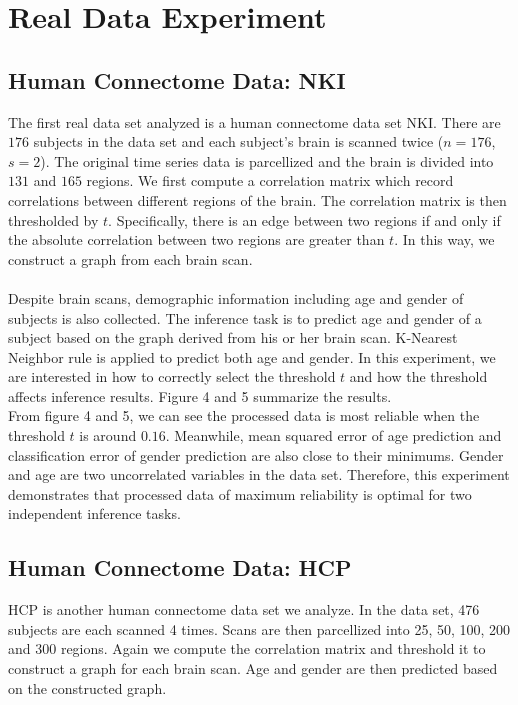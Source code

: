 \documentclass[11pt,journal,compsoc]{IEEEtran}
\begin{document}
\section{Real Data Experiment}
\subsection{Human Connectome Data: NKI}
The first real data set analyzed is a human connectome data set NKI. There are $176$ subjects in the data set and each subject's brain is scanned twice ($n=176$, $s=2$). The original time series data is parcellized and the brain is divided into $131$ and $165$ regions. We first compute a correlation matrix which record correlations between different regions of the brain. The correlation matrix is then thresholded by $t$. Specifically, there is an edge between two regions if and only if the absolute correlation between two regions are greater than $t$. In this way, we construct a graph from each brain scan.\\ 
\\
Despite brain scans, demographic information including age and gender of subjects is also collected. The inference task is to predict age and gender of a subject based on the graph derived from his or her brain scan. K-Nearest Neighbor rule is applied to predict both age and gender. In this experiment, we are interested in how to correctly select the threshold $t$ and how the threshold affects inference results. Figure 4 and 5 summarize the results.\\



\noindent From figure 4 and 5, we can see the processed data is most reliable when the threshold $t$ is around $0.16$. Meanwhile, mean squared error of age prediction and classification error of gender prediction are also close to their minimums. Gender and age are two uncorrelated variables in the data set. Therefore, this experiment demonstrates that processed data of maximum reliability is optimal for two independent inference tasks. 

\subsection{Human Connectome Data: HCP}
HCP is another human connectome data set we analyze. In the data set, 476 subjects are each scanned 4 times. Scans are then parcellized into 25, 50, 100, 200 and 300 regions. Again we compute the correlation matrix and threshold it to construct a graph for each brain scan. Age and gender are then predicted based on the constructed graph.\\
\end{document}
